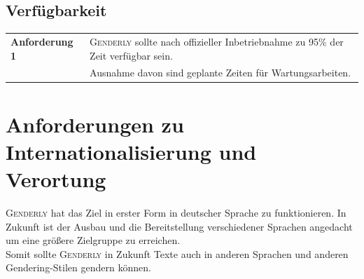 \documentclass[paper=a4, parskip=half]{scrreprt}
\newcommand{\Genderly}{\textsc{Genderly}}
\begin{document}
\section{Verfügbarkeit}
\begin{table}[!htb]
\begin{tabular}{ll}
\textbf{Anforderung 1} & \Genderly{} sollte nach offizieller Inbetriebnahme zu 95\% der Zeit verfügbar sein. \\
& Ausnahme davon sind geplante Zeiten für Wartungsarbeiten. \vspace{0.15cm}\\ 
\end{tabular}
\end{table}


\chapter{Anforderungen zu Internationalisierung und Verortung}
\Genderly{} hat das Ziel in erster Form in deutscher Sprache zu funktionieren. In Zukunft ist der Ausbau und die Bereitstellung verschiedener Sprachen angedacht um eine größere Zielgruppe zu erreichen. \\
Somit sollte \Genderly{} in Zukunft Texte auch in anderen Sprachen und anderen Gendering-Stilen gendern können.




\printglossary
\pagebreak

%
%


%
\end{document}
